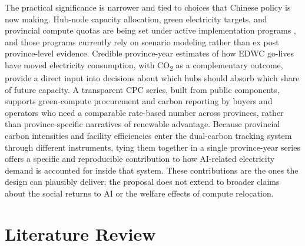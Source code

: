 \documentclass[12pt,a4paper]{article}
\begin{document}
The practical significance is narrower and tied to choices that
Chinese policy is now making. Hub-node capacity allocation, green
electricity targets, and provincial compute quotas are being set
under active implementation programs
\citep{chinaacademyofinformationandcommunicationstechnologyhoringernewarea-2024-zhongguolusesuanlifazhanyanjiubaogao2024nian},
and those programs currently rely on scenario modeling rather than
ex post province-level evidence. Credible province-year estimates of
how EDWC go-lives have moved electricity consumption, with
CO\textsubscript{2} as a complementary outcome, provide a direct input
into decisions about which hubs should absorb which share of future
capacity. A transparent CPC series, built from public components,
supports green-compute procurement and carbon reporting by buyers
and operators who need a comparable rate-based number across
provinces, rather than province-specific narratives of renewable
advantage. Because provincial carbon intensities and facility
efficiencies enter the dual-carbon tracking system through different
instruments, tying them together in a single province-year series
offers a specific and reproducible contribution to how AI-related
electricity demand is accounted for inside that system. These
contributions are the ones the design can plausibly deliver; the
proposal does not extend to broader claims about the social returns
to AI or the welfare effects of compute relocation.


%
%

\section{Literature Review}

\end{document}
